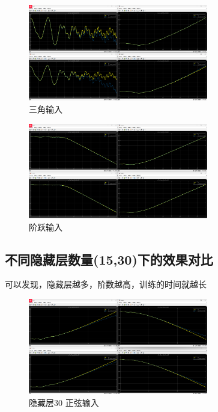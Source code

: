 \documentclass[12pt,a4paper,UTF8]{article}
\begin{document}
\begin{figure}[htbp] \centering \includegraphics[width=0.7\textwidth]{figures/2024-12-24-00-25-35.png} \caption{三角输入} \label{  }\end{figure}


\begin{figure}[htbp] \centering \includegraphics[width=0.7\textwidth]{figures/2024-12-24-00-26-26.png} \caption{阶跃输入} \label{  }\end{figure}


\newpage
\subsection{不同隐藏层数量(15,30)下的效果对比}

可以发现，隐藏层越多，阶数越高，训练的时间就越长

\begin{figure}[htbp] \centering \includegraphics[width=0.7\textwidth]{figures/2024-12-24-00-39-53.png} \caption{隐藏层30 正弦输入} \label{  }\end{figure}
\end{document}
